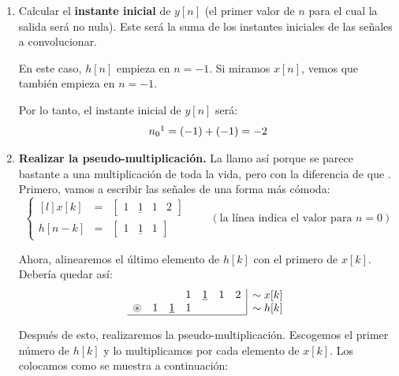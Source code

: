 \documentclass[a4paper]{book}
\begin{document}
\begin{enumerate}
\item Calcular el \textbf{instante inicial} de $y[n]$ (el primer valor de $n$ para el cual la salida será no nula). Este será la suma de los instantes iniciales de las señales a convolucionar.

En este caso, $h[n]$ empieza en $n=-1$. Si miramos $x[n]$, vemos que también empieza en $n=-1$.

Por lo tanto, el instante inicial de $y[n]$ será: \[n_0\footnotemark = (-1)+(-1) = -2\]

\item \textbf{Realizar la pseudo-multiplicación.} La llamo así porque se parece bastante a una multiplicación de toda la vida, pero con la diferencia de que . Primero, vamos a escribir las señales de una forma más cómoda: \[\left\lbrace \begin{matrix*}[l]
x[k] &=& [\begin{matrix} 1 & \underline{1}& 1 &2 \end{matrix} ]\\[5pt]
h[n-k] &=& [\begin{matrix} 1 & \underline{1}& 1 \end{matrix} ]
\end{matrix*} \right. \qquad (\text{la línea indica el valor para }n=0)\]

Ahora, alinearemos el último elemento de $h[k]$ con el primero de $x[k]$. Debería quedar así:
\[ \begin{array}{ccccccc}
&   &               & 1 & \underline{1} & 1 & 2 \\
\circledast & 1 & \underline{1} & 1 &               &   &   \\
\hline
\end{array}
\begin{array}{|l}
\sim x[k] \\
\sim h[k]
\end{array}\]

Después de esto, realizaremos la pseudo-multiplicación. Escogemos el primer número de $h[k]$ y lo multiplicamos por cada elemento de $x[k]$. Los colocamos como se muestra a continuación:


\end{enumerate}
\end{document}
